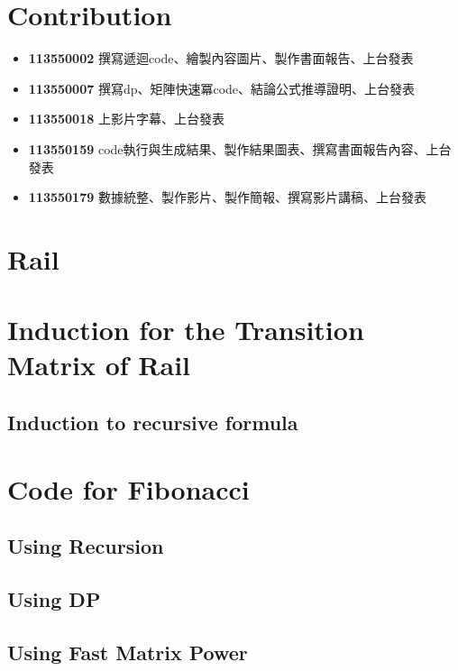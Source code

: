 \section{Contribution}
\begin{itemize}
    \item []\textbf{113550002} 撰寫遞迴code、繪製內容圖片、製作書面報告、上台發表
    \item []\textbf{113550007} 撰寫dp、矩陣快速冪code、結論公式推導證明、上台發表
    \item []\textbf{113550018} 上影片字幕、上台發表
    \item []\textbf{113550159} code執行與生成結果、製作結果圖表、撰寫書面報告內容、上台發表
    \item []\textbf{113550179} 數據統整、製作影片、製作簡報、撰寫影片講稿、上台發表
\end{itemize}


\section{Rail}
\label{rail}


\section{Induction for the Transition Matrix of Rail}
\label{induction for Rail}

\subsection{Induction to recursive formula} 

\section{Code for Fibonacci}
\label{Fibonacci Code}
\subsection{Using Recursion}


\subsection{Using DP}


\subsection{Using Fast Matrix Power}


